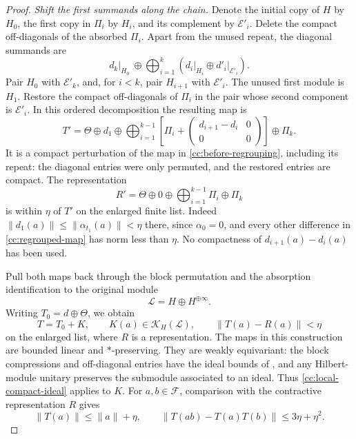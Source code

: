 \begin{proof}
\smallskip\noindent\emph{Shift the first summands along the chain.} 
Denote the initial copy of
$H$ by $H_0$, the first copy in $\Pi_i$ by $H_i$, and its
complement by $\mathcal E'_i$.  Delete the compact off-diagonals
of the absorbed $\Pi_i$.  Apart from the unused repeat, the
diagonal summands are
\begin{equation}\label{cc:before-regrouping}
 d_k\big|_{H_0}\ \oplus
 \bigoplus_{i=1}^k
 \left(d_i\big|_{H_i}\oplus d'_i\big|_{\mathcal E'_i}\right).
\end{equation}
Pair $H_0$ with $\mathcal E'_k$, and, for $i<k$, pair
$H_{i+1}$ with $\mathcal E'_i$.  The unused first module is
$H_1$.  Restore the compact off-diagonals of $\Pi_i$ in the pair
whose second component is $\mathcal E'_i$.  In this ordered
decomposition the resulting map is
\begin{equation}\label{cc:regrouped-map}
 T'=\Theta\oplus d_1\oplus
 \bigoplus_{i=1}^{k-1}
 \left[\Pi_i+
 \begin{pmatrix}d_{i+1}-d_i&0\\0&0\end{pmatrix}\right]
 \oplus\Pi_k.
\end{equation}
It is a compact perturbation of the map in
\eqref{cc:before-regrouping}, including its repeat: the diagonal
entries were only permuted, and the restored entries are compact.
The representation
\begin{equation}\label{cc:comparison-representation}
 R'=\Theta\oplus0\oplus
 \bigoplus_{i=1}^{k-1}\Pi_i\oplus\Pi_k
\end{equation}
is within $\eta$ of $T'$ on the enlarged finite list.  Indeed
$\|d_1(a)\|\le\|\alpha_{t_1}(a)\|<\eta$ there, since
$\alpha_0=0$, and every other difference in
\eqref{cc:regrouped-map} has norm less than $\eta$.
No compactness of $d_{i+1}(a)-d_i(a)$ has been used.

Pull both maps back through the block permutation and the
absorption identification to the original module
\[
 \mathcal L=H\oplus H^{\oplus\infty}.
\]
Writing $T_0=d\oplus\Theta$, we obtain
\begin{equation}\label{cc:T-plus-K}
 T=T_0+K,\qquad
 K(a)\in\mathcal K_H(\mathcal L),\qquad
 \|T(a)-R(a)\|<\eta
\end{equation}
on the enlarged list, where $R$ is a representation.
The maps in this construction are bounded linear and
$*$-preserving.  They are weakly equivariant: the block
compressions and off-diagonal entries have the ideal bounds of
, and any Hilbert-module unitary preserves
the submodule associated to an ideal.  Thus
\eqref{cc:local-compact-ideal} applies to $K$.
For $a,b\in\mathcal F$, comparison with the contractive
representation $R$ gives
\begin{equation}\label{cc:T-estimates}
 \|T(a)\|\le\|a\|+\eta,
 \qquad
 \|T(ab)-T(a)T(b)\|\le3\eta+\eta^2.
\end{equation}


\end{proof}
